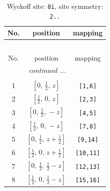 \documentclass[fleqn,8pt]{jsarticle}
\begin{document}
\renewcommand{\arraystretch}{1.2}
\begin{longtable}{ccc}
\caption{Wyckoff site: {\tt 8i}, site symmetry: {\tt 2..}}
 \\
 \hline \hline
No. & position & mapping \\ \hline \endfirsthead

\multicolumn{2}{l}{\tablename\ \thetable{}} \\
 \hline \hline
No. & position & mapping \\ \hline \endhead

 \hline \hline
\multicolumn{2}{r}{\footnotesize\it continued ...} \\ \endfoot

 \hline \hline
\multicolumn{2}{r}{} \\ \endlastfoot

1 & $\left[ 0,\, \frac{1}{2},\, z \right]$ & {\tt [1,6]} \\ \hline
2 & $\left[ \frac{1}{2},\, 0,\, z \right]$ & {\tt [2,3]} \\ \hline
3 & $\left[ 0,\, \frac{1}{2},\, - z \right]$ & {\tt [4,5]} \\ \hline
4 & $\left[ \frac{1}{2},\, 0,\, - z \right]$ & {\tt [7,8]} \\ \hline
5 & $\left[ 0,\, \frac{1}{2},\, z + \frac{1}{2} \right]$ & {\tt [9,14]} \\ \hline
6 & $\left[ \frac{1}{2},\, 0,\, z + \frac{1}{2} \right]$ & {\tt [10,11]} \\ \hline
7 & $\left[ 0,\, \frac{1}{2},\, \frac{1}{2} - z \right]$ & {\tt [12,13]} \\ \hline
8 & $\left[ \frac{1}{2},\, 0,\, \frac{1}{2} - z \right]$ & {\tt [15,16]} \\
\end{longtable}
\renewcommand{\arraystretch}{1.2}
\end{document}
